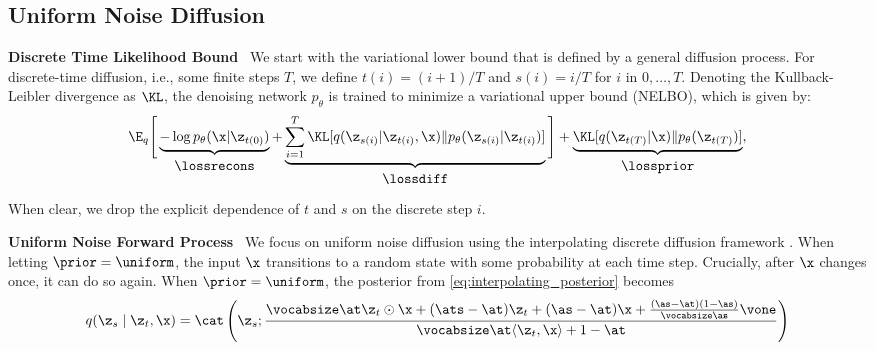 \documentclass{article} %
\begin{document}
\subsection{Uniform Noise Diffusion}
\textbf{Discrete Time Likelihood Bound}~
We start with the variational lower bound that is defined by a general diffusion process.
For discrete-time diffusion, i.e., some finite steps $T$, we define $t(i) = (i+1)/T$ and $s(i) = i / T$ for $i$ in $0, \ldots, T.$
Denoting the Kullback-Leibler divergence as $\KL$, the denoising network $p_\theta$ is trained to minimize a variational upper bound (NELBO), which is given by:
\begin{equation}\label{eq:nelbo}
    \E_q\Bigg[\underbrace{- \log p_\theta(
    \x | \z_{t(0)})}_{
    \begin{array}{c}\lossrecons\end{array}} + \underbrace{\sum_{i=1}^T \KL[q(\z_{s(i)} | \z_{t(i)}, \x) \| p_\theta(\z_{s(i)} | \z_{t(i)})]}_{
    \begin{array}{c}\lossdiff\end{array}}\Bigg]
    + \underbrace{\KL[q(\z_{t(T)} | \x) \| p_\theta(\z_{t(T)})]}_{
    \begin{array}{c}\lossprior\end{array}},
\end{equation}
When clear, we drop the explicit dependence of $t$ and $s$ on the discrete step $i$.

\textbf{Uniform Noise Forward Process}~
We focus on uniform noise diffusion using the interpolating discrete diffusion framework \citep{sahoo2024simple, zhao2024improving, zheng2023reparameterized}.
When letting $\prior = \uniform$, the input $\x$ transitions to a random state with some probability at each time step. 
Crucially, after $\x$ changes once, it can do so again.
When $\prior = \uniform$, the posterior from \eqref{eq:interpolating_posterior} becomes
\begin{equation}\label{eq:uniform_posterior}    
    q(\z_s \mid \z_t, \x)
    = \cat \left(
        \z_s;
        \frac{
            \vocabsize\at \z_t \odot \x + (\ats - \at)\z_t + (\as - \at)\x + \frac{(\as - \at)(1- \as)}{\vocabsize\as}\vone
            }
            {
             \vocabsize \at\langle \z_t, \x\rangle  + 1 - \at
            }
        \right)
\end{equation}
\end{document}
